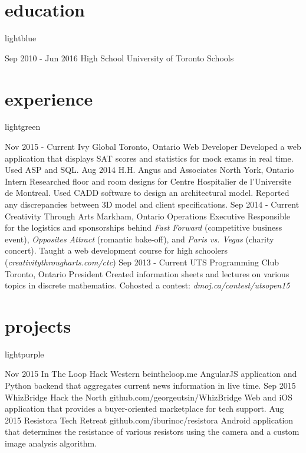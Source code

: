 \documentclass{resume}
\begin{document}
	\begin{main}
		\vspace{10pt}\section{education}{lightblue}
			\begin{entrylist}
				\rightentry%
				{Sep 2010 - Jun 2016}%
				{High School}%
				{University of Toronto Schools}%
				{}{}
			\end{entrylist}
		\section{experience}{lightgreen}
			\begin{entrylist}
				\rightentry%
					{Nov 2015 - Current}%
					{Ivy Global}%
					{Toronto, Ontario}%
					{Web Developer}%
					{Developed a web application that displays SAT scores and statistics for mock exams in real time. Used ASP and SQL.}
				\rightentry%
					{Aug 2014}%
					{H.H. Angus and Associates}%
					{North York, Ontario}%
					{Intern}%
					{Researched floor and room designs for Centre Hospitalier de l'Universite de Montreal. Used CADD software to design an architectural model. Reported any discrepancies between 3D model and client specifications.}
				\rightentry%
					{Sep 2014 - Current}%
					{Creativity Through Arts}%
					{Markham, Ontario}%
					{Operations Executive}%
					{Responsible for the logistics and sponsorships behind \emph{Fast Forward} (competitive business event), \emph{Opposites Attract} (romantic bake-off), and \emph{Paris vs. Vegas} (charity concert). Taught a web development course for high schoolers (\emph{creativitythrougharts.com/ctc})}
				\rightentry%
					{Sep 2013 - Current}%
					{UTS Programming Club}%
					{Toronto, Ontario}%
					{President}%
					{Created information sheets and lectures on various topics in discrete mathematics. Cohosted a contest: \emph{dmoj.ca/contest/utsopen15}}
			\end{entrylist}
		\section{projects}{lightpurple}
			\begin{entrylist}
				\rightentry%
					{Nov 2015}%
					{In The Loop}%
					{Hack Western}%
					{beintheloop.me}%
					{AngularJS application and Python backend that aggregates current news information in live time.}
				\rightentry%
					{Sep 2015}%
					{WhizBridge}%
					{Hack the North}%
					{github.com/georgeutsin/WhizBridge}%
					{Web and iOS application that provides a buyer-oriented marketplace for tech support.}
				\rightentry%
					{Aug 2015}%
					{Resistora}%
					{Tech Retreat}%
					{github.com/iburinoc/resistora}%
					{Android application that determines the resistance of various resistors using the camera and a custom image analysis algorithm.}
			\end{entrylist}	
	\end{main}
\end{document}
